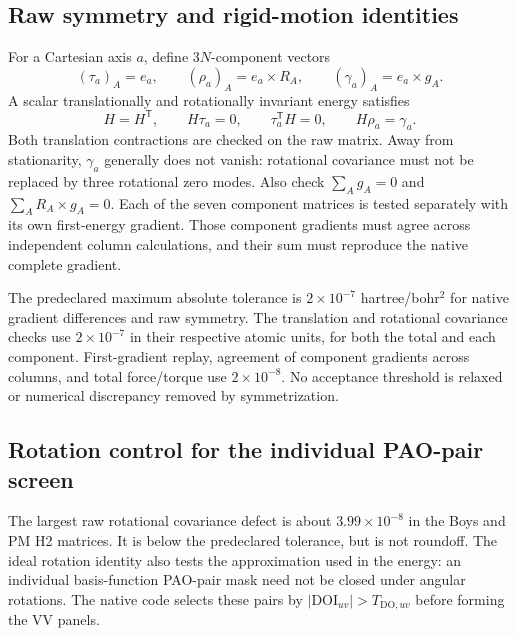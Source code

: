 \documentclass[11pt]{article}
\begin{document}
\subsection{Raw symmetry and rigid-motion identities}
For a Cartesian axis $a$, define $3N$-component vectors
\begin{equation}
 (\tau_a)_A=e_a,\qquad
 (\rho_a)_A=e_a\mathbin{\times}R_A,\qquad
 (\gamma_a)_A=e_a\mathbin{\times}g_A.
\end{equation}
A scalar translationally and rotationally invariant energy satisfies
\begin{equation}
 H=H^{\mathsf T},\qquad H\tau_a=0,\qquad
 \tau_a^{\mathsf T}H=0,\qquad H\rho_a=\gamma_a.
 \label{eq:screened-matrix-identities}
\end{equation}
Both translation contractions are checked on the raw matrix. Away from
stationarity, $\gamma_a$ generally does not vanish: rotational covariance
must not be replaced by three rotational zero modes. Also check
$\sum_Ag_A=0$ and $\sum_AR_A\times g_A=0$.
Each of the seven component matrices is tested separately with its own
first-energy gradient. Those component gradients must agree across
independent column calculations, and their sum must reproduce the native
complete gradient.

The predeclared maximum absolute tolerance is $2\times10^{-7}$
hartree/bohr$^2$ for native gradient differences and raw symmetry.
The translation and rotational covariance checks use $2\times10^{-7}$
in their respective atomic units, for both the total and each component.
First-gradient replay, agreement of component gradients across columns,
and total force/torque use $2\times10^{-8}$. No acceptance threshold is
relaxed or numerical discrepancy removed by symmetrization.

\subsection{Rotation control for the individual PAO-pair screen}
The largest raw rotational covariance defect is about
$3.99\times10^{-8}$ in the Boys and PM H2 matrices. It is below the
predeclared tolerance, but is not roundoff. The ideal rotation identity
also tests the approximation used in the energy: an individual
basis-function PAO-pair mask need not be closed under angular rotations.
The native code selects these pairs by
$|\mathrm{DOI}_{uv}|>T_{\mathrm{DO},uv}$ before forming the VV panels.
\end{document}

